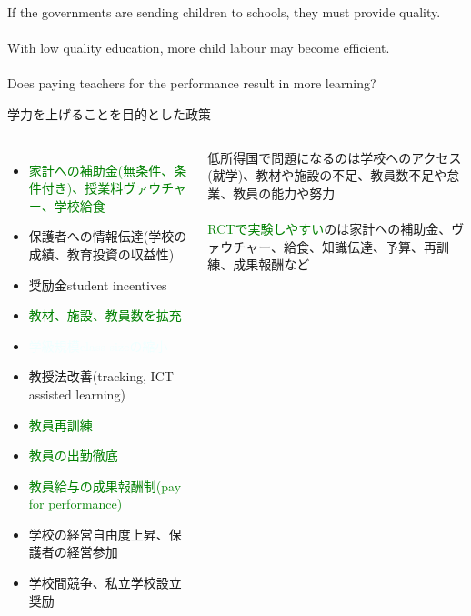 \begin{frame}{}

If the governments are sending children to schools, they must provide quality.\\~\\
\pause
With low quality education, more child labour may become efficient.\\~\\
\pause
Does paying teachers for the performance result in more learning?
\end{frame}

\begin{frame}[t]{}
学力を上げることを目的とした政策
\begin{columns}[T]
\column{.65\paperwidth}
\begin{itemize}
\vspace{1.0ex}\setlength{\itemsep}{1.0ex}\setlength{\baselineskip}{12pt}
\item	\textcolor{green}{家計への補助金(無条件、条件付き)、授業料ヴァウチャー、学校給食}
\item	保護者への情報伝達(学校の成績、教育投資の収益性)
\item	奨励金student incentives
\item	\textcolor{green}{教材、施設、教員数を拡充}
\item	\textcolor{azure}{学級規模class sizeの縮小}
\item	教授法改善(tracking, ICT assisted learning)
\item	\textcolor{green}{教員再訓練}
\item	\textcolor{green}{教員の出勤徹底}
\item	\textcolor{green}{教員給与の成果報酬制(pay for performance)}
\item	学校の経営自由度上昇、保護者の経営参加
\item	学校間競争、私立学校設立奨励
\end{itemize}
\column{.3\paperwidth}
\pause
低所得国で問題になるのは学校へのアクセス(就学)、教材や施設の不足、教員数不足や怠業、教員の能力や努力\\~\\
\pause
\textcolor{green}{RCTで実験しやすい}のは家計への補助金、ヴァウチャー、給食、知識伝達、予算、再訓練、成果報酬など
\end{columns}
\end{frame}

